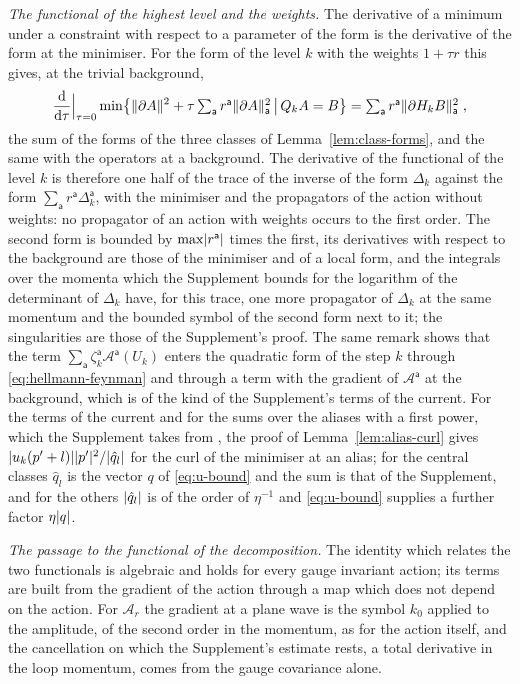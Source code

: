 \documentclass[11pt]{preprint}
\newcommand{\dd}{\mathrm{d}}
\DeclarePairedDelimiter{\abs}{\lvert}{\rvert}
\DeclarePairedDelimiter{\norm}{\lVert}{\rVert}
\numberwithin{equation}{section}
\theoremstyle{definition}
\theoremstyle{remark}
\theoremstyle{plain}
\begin{document}
\emph{The functional of the highest level and the weights.} The derivative of a minimum under a constraint with respect to a parameter of the form is the derivative of the form at the minimiser. For the form of the level $k$ with the weights $1 + \tau r$ this gives, at the trivial background,
\begin{equation}\label{eq:hellmann-feynman}
    \frac{\dd}{\dd\tau}\Big|_{\tau=0}\min\bigl\{ \norm{\partial A}^2 + \tau\textstyle\sum_{\mathsf a}r^{\mathsf a}\norm{\partial A}_{\mathsf a}^2 \, \big| \, Q_kA = B \bigr\} = \sum_{\mathsf a}r^{\mathsf a}\norm{\partial H_kB}_{\mathsf a}^2\;,
\end{equation}
the sum of the forms of the three classes of Lemma~\ref{lem:class-forms}, and the same with the operators at a background. The derivative of the functional of the level $k$ is therefore one half of the trace of the inverse of the form $\Delta_k$ against the form $\sum_{\mathsf a}r^{\mathsf a}\Delta^{\mathsf a}_k$, with the minimiser and the propagators of the action without weights: no propagator of an action with weights occurs to the first order. The second form is bounded by $\max\abs{r^{\mathsf a}}$ times the first, its derivatives with respect to the background are those of the minimiser and of a local form, and the integrals over the momenta which the Supplement bounds for the logarithm of the determinant of $\Delta_k$ have, for this trace, one more propagator of $\Delta_k$ at the same momentum and the bounded symbol of the second form next to it; the singularities are those of the Supplement's proof. The same remark shows that the term $\sum_{\mathsf a}\zeta^{\mathsf a}_k\mathcal A^{\mathsf a}(U_k)$ enters the quadratic form of the step $k$ through \eqref{eq:hellmann-feynman} and through a term with the gradient of $\mathcal A^{\mathsf a}$ at the background, which is of the kind of the Supplement's terms of the current. For the terms of the current and for the sums over the aliases with a first power, which the Supplement takes from \cite[(1.63)]{BalabanPRT1}, the proof of Lemma~\ref{lem:alias-curl} gives $\abs{u_k(p' + l)}\abs{p'}^2/\abs{\hat q_l}$ for the curl of the minimiser at an alias; for the central classes $\hat q_l$ is the vector $q$ of \eqref{eq:u-bound} and the sum is that of the Supplement, and for the others $\abs{\hat q_l}$ is of the order of $\eta^{-1}$ and \eqref{eq:u-bound} supplies a further factor $\eta\abs q$.

\emph{The passage to the functional of the decomposition.} The identity which relates the two functionals is algebraic and holds for every gauge invariant action; its terms are built from the gradient of the action through a map which does not depend on the action. For $\mathcal A_r$ the gradient at a plane wave is the symbol $k_0$ applied to the amplitude, of the second order in the momentum, as for the action itself, and the cancellation on which the Supplement's estimate rests, a total derivative in the loop momentum, comes from the gauge covariance alone.
\end{document}
